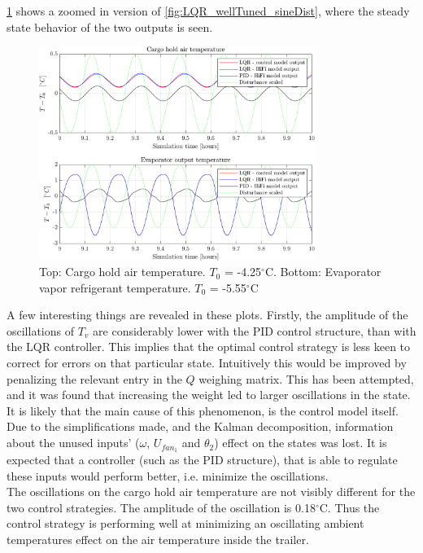 \cref{fig:LQR_wellTuned_sineDist_zoom} shows a zoomed in version of \cref{fig:LQR_wellTuned_sineDist}, where the steady state behavior of the two outputs is seen.\\


\begin{figure}[H]
	\centering
	\includegraphics[width=0.8\textwidth]{Graphics/fig_LQRvsKresten_sineDist_zoom.png}
	\caption{Top: Cargo hold air temperature. $T_0$ = -4.25$^{\circ}$C. Bottom: Evaporator vapor refrigerant temperature. $T_0$ = -5.55$^{\circ}$C}
	\label{fig:LQR_wellTuned_sineDist_zoom}
\end{figure}

A few interesting things are revealed in these plots. Firstly, the amplitude of the oscillations of $T_v$ are considerably lower with the PID control structure, than with the LQR controller. This implies that the optimal control strategy is less keen to correct for errors on that particular state. Intuitively this would be improved by penalizing the relevant entry in the $Q$ weighing matrix. This has been attempted, and it was found that increasing the weight led to larger oscillations in the state. \\

It is likely that the main cause of this phenomenon, is the control model itself. Due to the simplifications made, and the Kalman decomposition, information about the unused inputs' ($\omega$, $U_{fan_1}$ and $\theta_2$) effect on the states was lost. It is expected that a controller (such as the PID structure), that is able to regulate these inputs would perform better, i.e. minimize the oscillations.\\

The oscillations on the cargo hold air temperature are not visibly different for the two control strategies. The amplitude of the oscillation is 0.18$^{\circ}$C. Thus the control strategy is performing well at minimizing an oscillating ambient temperatures effect on the air temperature inside the trailer. \\

